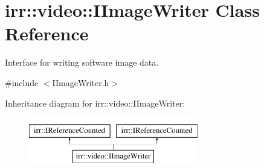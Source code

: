 \hypertarget{classirr_1_1video_1_1IImageWriter}{}\section{irr\+:\+:video\+:\+:I\+Image\+Writer Class Reference}
\label{classirr_1_1video_1_1IImageWriter}


Interface for writing software image data.  




{\ttfamily \#include $<$I\+Image\+Writer.\+h$>$}

Inheritance diagram for irr\+:\+:video\+:\+:I\+Image\+Writer\+:\begin{figure}[H]
\begin{center}
\leavevmode
\includegraphics[height=2.000000cm]{classirr_1_1video_1_1IImageWriter}
\end{center}
\end{figure}
